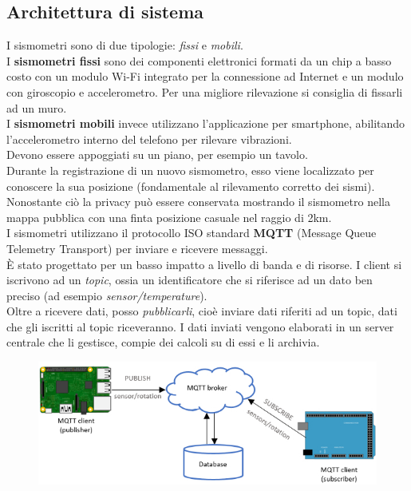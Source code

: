 \documentclass[a4paper,10pt]{memoir}
\begin{document}
\subsection{Architettura di sistema}
I sismometri sono di due tipologie: \textit{fissi} e \textit{mobili}.
\\
I \textbf{sismometri fissi} sono dei componenti elettronici formati da un chip a basso costo con un modulo Wi-Fi integrato per la connessione ad Internet e un modulo con giroscopio e accelerometro.
Per una migliore rilevazione si consiglia di fissarli ad un muro.
\\
I \textbf{sismometri mobili} invece utilizzano l'applicazione per smartphone, abilitando l'accelerometro interno del telefono per rilevare vibrazioni.
\\
Devono essere appoggiati su un piano, per esempio un tavolo.
\\
Durante la registrazione di un nuovo sismometro, esso viene localizzato per conoscere la sua posizione (fondamentale al rilevamento corretto dei sismi). Nonostante ciò la privacy può essere conservata mostrando il sismometro nella mappa pubblica con una finta posizione casuale nel raggio di 2km.
\\
I sismometri utilizzano il protocollo ISO standard \textbf{MQTT} (Message Queue Telemetry Transport) per inviare e ricevere messaggi.
\\
È stato progettato per un basso impatto a livello di banda e di risorse. I client si iscrivono ad un \textit{topic}, ossia un identificatore che si riferisce ad un dato ben preciso (ad esempio \textit{sensor/temperature}).
\\
Oltre a ricevere dati, posso \textit{pubblicarli}, cioè inviare dati riferiti ad un topic, dati che gli iscritti al topic riceveranno. 
I dati inviati vengono elaborati in un server centrale che li gestisce, compie dei calcoli su di essi e li archivia.\\

\begin{figure}[H]
\includegraphics[width=1\textwidth]{Chapter-1/mqtt.jpg}
\end{figure}
\end{document}
